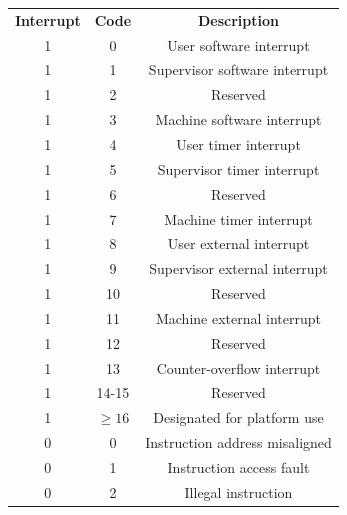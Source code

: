 \begin{table}
  \centering
  \begin{tabular}{|c|c|c|}
    \hline
    \textbf{Interrupt} & \textbf{Code} & \textbf{Description}           \\
    \hhline{===} 1     & 0             & User software interrupt        \\
    \hline
    1                  & 1             & Supervisor software interrupt  \\
    \hline
    1                  & 2             & Reserved                       \\
    \hline
    1                  & 3             & Machine software interrupt     \\
    \hline
    1                  & 4             & User timer interrupt           \\
    \hline
    1                  & 5             & Supervisor timer interrupt     \\
    \hline
    1                  & 6             & Reserved                       \\
    \hline
    1                  & 7             & Machine timer interrupt        \\
    \hline
    1                  & 8             & User external interrupt        \\
    \hline
    1                  & 9             & Supervisor external interrupt  \\
    \hline
    1                  & 10            & Reserved                       \\
    \hline
    1                  & 11            & Machine external interrupt     \\
    \hline
    1                  & 12            & Reserved                       \\
    \hline
    1                  & 13            & Counter-overflow interrupt     \\
    \hline
    1                  & 14-15         & Reserved                       \\
    \hline
    1                  & $\geq 16$     & Designated for platform use    \\
    \hhline{===} 0     & 0             & Instruction address misaligned \\
    \hline
    0                  & 1             & Instruction access fault       \\
    \hline
    0                  & 2             & Illegal instruction            \\

\end{tabular}
\end{table}

